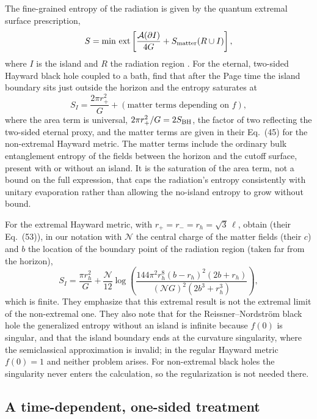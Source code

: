 \documentclass[11pt]{article}
\begin{document}
The fine-grained entropy of the radiation is given by the quantum extremal surface prescription,
\begin{equation}
S=\min\,\mathrm{ext}\left[\frac{\mathcal{A}(\partial I)}{4G}+S_{\rm matter}(R\cup I)\right],
\end{equation}
where $I$ is the island and $R$ the radiation region \citep{EngelhardtWall2015,AMMZ2019}. For the eternal, two-sided Hayward black hole coupled to a bath, \citet{KimNam2021} find that after the Page time the island boundary sits just outside the horizon and the entropy saturates at
\begin{equation}
S_I=\frac{2\pi r_+^2}{G}+\left(\text{matter terms depending on }f\right),
\end{equation}
where the area term is universal, $2\pi r_+^2/G=2S_{\rm BH}$, the factor of two reflecting the two-sided eternal proxy, and the matter terms are given in their Eq.~(45) for the non-extremal Hayward metric. The matter terms include the ordinary bulk entanglement entropy of the fields between the horizon and the cutoff surface, present with or without an island. It is the saturation of the area term, not a bound on the full expression, that caps the radiation's entropy consistently with unitary evaporation rather than allowing the no-island entropy to grow without bound.

For the extremal Hayward metric, with $r_+=r_-=r_h=\sqrt3\,\ell$, \citet{KimNam2021} obtain (their Eq.~(53)), in our notation with $\mathcal{N}$ the central charge of the matter fields (their $c$) and $b$ the location of the boundary point of the radiation region (taken far from the horizon),
\begin{equation}
S_I=\frac{\pi r_h^2}{G}+\frac{\mathcal{N}}{12}\log\!\left(\frac{144\pi^2r_h^8(b-r_h)^2(2b+r_h)}{(\mathcal{N}G)^2(2b^3+r_h^3)}\right),
\label{eq:KN-extremal}
\end{equation}
which is finite. They emphasize that this extremal result is not the extremal limit of the non-extremal one. They also note that for the Reissner--Nordstr\"om black hole the generalized entropy without an island is infinite because $f(0)$ is singular, and that the island boundary ends at the curvature singularity, where the semiclassical approximation is invalid; in the regular Hayward metric $f(0)=1$ and neither problem arises. For non-extremal black holes the singularity never enters the calculation, so the regularization is not needed there.

\subsection{A time-dependent, one-sided treatment}
\end{document}
